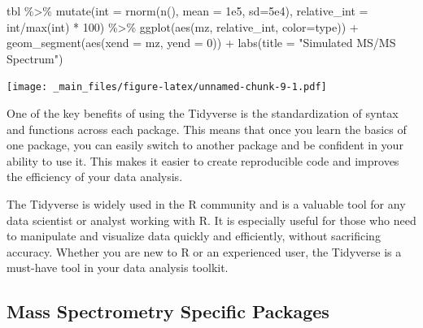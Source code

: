 \documentclass[
]{book}
\newenvironment{Shaded}{\begin{snugshade}}{\end{snugshade}}
\newcommand{\AttributeTok}[1]{\textcolor[rgb]{0.77,0.63,0.00}{#1}}
\newcommand{\DecValTok}[1]{\textcolor[rgb]{0.00,0.00,0.81}{#1}}
\newcommand{\FloatTok}[1]{\textcolor[rgb]{0.00,0.00,0.81}{#1}}
\newcommand{\FunctionTok}[1]{\textcolor[rgb]{0.00,0.00,0.00}{#1}}
\newcommand{\NormalTok}[1]{#1}
\newcommand{\SpecialCharTok}[1]{\textcolor[rgb]{0.00,0.00,0.00}{#1}}
\newcommand{\StringTok}[1]{\textcolor[rgb]{0.31,0.60,0.02}{#1}}
\begin{document}
\begin{Shaded}
\begin{Highlighting}[]
\NormalTok{tbl }\SpecialCharTok{\%\textgreater{}\%}
  \FunctionTok{mutate}\NormalTok{(}\AttributeTok{int =} \FunctionTok{rnorm}\NormalTok{(}\FunctionTok{n}\NormalTok{(), }\AttributeTok{mean =} \FloatTok{1e5}\NormalTok{, }\AttributeTok{sd=}\FloatTok{5e4}\NormalTok{),}
         \AttributeTok{relative\_int =}\NormalTok{ int}\SpecialCharTok{/}\FunctionTok{max}\NormalTok{(int) }\SpecialCharTok{*} \DecValTok{100}\NormalTok{) }\SpecialCharTok{\%\textgreater{}\%}
  \FunctionTok{ggplot}\NormalTok{(}\FunctionTok{aes}\NormalTok{(mz, relative\_int, }\AttributeTok{color=}\NormalTok{type)) }\SpecialCharTok{+}
  \FunctionTok{geom\_segment}\NormalTok{(}\FunctionTok{aes}\NormalTok{(}\AttributeTok{xend =}\NormalTok{ mz, }\AttributeTok{yend =} \DecValTok{0}\NormalTok{)) }\SpecialCharTok{+}
  \FunctionTok{labs}\NormalTok{(}\AttributeTok{title =} \StringTok{"Simulated MS/MS Spectrum"}\NormalTok{)}
\end{Highlighting}
\end{Shaded}

\texttt{[image: \_main\_files/figure-latex/unnamed-chunk-9-1.pdf]}

One of the key benefits of using the Tidyverse is the standardization of syntax and functions across each package. This means that once you learn the basics of one package, you can easily switch to another package and be confident in your ability to use it. This makes it easier to create reproducible code and improves the efficiency of your data analysis.

The Tidyverse is widely used in the R community and is a valuable tool for any data scientist or analyst working with R. It is especially useful for those who need to manipulate and visualize data quickly and efficiently, without sacrificing accuracy. Whether you are new to R or an experienced user, the Tidyverse is a must-have tool in your data analysis toolkit.

\hypertarget{mass-spectrometry-specific-packages}{%
\subsection{Mass Spectrometry Specific Packages}\label{mass-spectrometry-specific-packages}}
\end{document}
